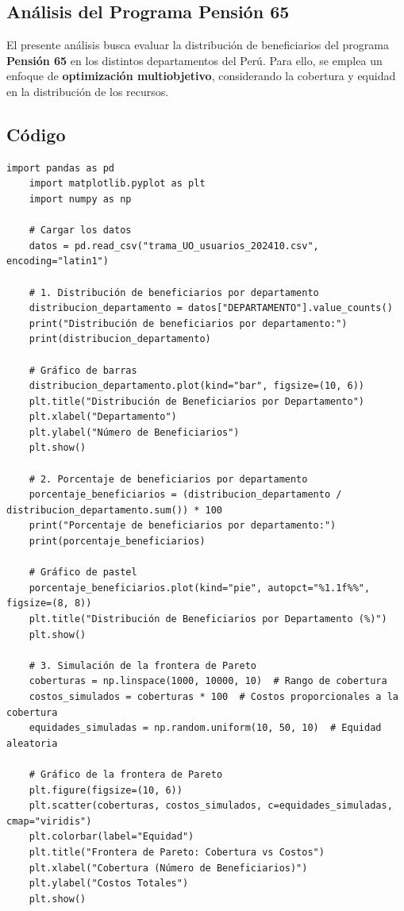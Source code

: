 \documentclass[12pt]{article}
\begin{document}
\subsection*{Análisis del Programa Pensión 65}

El presente análisis busca evaluar la distribución de beneficiarios del programa \textbf{Pensión 65} en los distintos departamentos del Perú. Para ello, se emplea un enfoque de \textbf{optimización multiobjetivo}, considerando la cobertura y equidad en la distribución de los recursos.

\subsection*{Código}

\begin{lstlisting}[style=python]
	import pandas as pd
	import matplotlib.pyplot as plt
	import numpy as np
	
	# Cargar los datos
	datos = pd.read_csv("trama_UO_usuarios_202410.csv", encoding="latin1")
	
	# 1. Distribución de beneficiarios por departamento
	distribucion_departamento = datos["DEPARTAMENTO"].value_counts()
	print("Distribución de beneficiarios por departamento:")
	print(distribucion_departamento)
	
	# Gráfico de barras
	distribucion_departamento.plot(kind="bar", figsize=(10, 6))
	plt.title("Distribución de Beneficiarios por Departamento")
	plt.xlabel("Departamento")
	plt.ylabel("Número de Beneficiarios")
	plt.show()
	
	# 2. Porcentaje de beneficiarios por departamento
	porcentaje_beneficiarios = (distribucion_departamento / distribucion_departamento.sum()) * 100
	print("Porcentaje de beneficiarios por departamento:")
	print(porcentaje_beneficiarios)
	
	# Gráfico de pastel
	porcentaje_beneficiarios.plot(kind="pie", autopct="%1.1f%%", figsize=(8, 8))
	plt.title("Distribución de Beneficiarios por Departamento (%)")
	plt.show()
	
	# 3. Simulación de la frontera de Pareto
	coberturas = np.linspace(1000, 10000, 10)  # Rango de cobertura
	costos_simulados = coberturas * 100  # Costos proporcionales a la cobertura
	equidades_simuladas = np.random.uniform(10, 50, 10)  # Equidad aleatoria
	
	# Gráfico de la frontera de Pareto
	plt.figure(figsize=(10, 6))
	plt.scatter(coberturas, costos_simulados, c=equidades_simuladas, cmap="viridis")
	plt.colorbar(label="Equidad")
	plt.title("Frontera de Pareto: Cobertura vs Costos")
	plt.xlabel("Cobertura (Número de Beneficiarios)")
	plt.ylabel("Costos Totales")
	plt.show()
\end{lstlisting}
\end{document}
